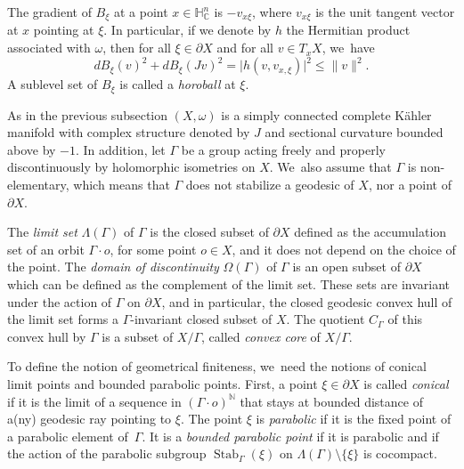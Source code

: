 \documentclass[JEP,XML,SOM,Unicode,NoEqCountersInSection,published]{cedram}
\theoremstyle{definition}
\newcommand{\C}{\mathbb{C}}
\newcommand{\N}{\mathbb{N}}
\newcommand{\HNC}{\mathbb{H}^{n}_{\C}}
\def\C{\mathbb{C}}
\newcommand{\HNC}{\mathbb{H}^{n}_{\C}}
\begin{document}
The gradient of $B_{\xi}$ at a point $x\in \HNC$ is $-v_{x\xi}$, where $v_{x\xi}$ is the unit tangent vector at $x$ pointing at $\xi$. In particular, if we denote by $h$ the Hermitian product associated with $\omega$, then for all $\xi\in \partial X$ and for all $v\in T_xX$, we~have\begin{equation}\label{ineq-dBJ}
dB_{\xi}(v)^{2} + dB_{\xi}(Jv)^{2} = \lvert h(v,v_{x,\xi})\rvert^{2}\le \lVert v\rVert^{2}.
\end{equation}
A sublevel set of $B_{\xi}$ is called a \textit{horoball} at $\xi$.

\label{sec:gen-geom-finite}

As in the previous subsection $(X,\omega)$ is a simply connected complete Kähler manifold with complex structure denoted by $J$ and sectional curvature bounded above by $-1$. In addition, let $\Gamma$ be a group acting freely and properly discontinuously by holomorphic isometries on $X$. We~also assume that $\Gamma$ is non-elementary, which means that $\Gamma$ does not stabilize a geodesic of $X$, nor a point of $\partial X$.\par

The \textit{limit set} $\Lambda(\Gamma)$ of $\Gamma$ is the closed subset of $\partial X$ defined as the accumulation set of an orbit $\Gamma \cdot o$, for some point $o\in X$, and it does not depend on the choice of the point. The \textit{domain of discontinuity} $\Omega(\Gamma)$ of $\Gamma$ is an open subset of $\partial X$ which can be defined as the complement of the limit set. These sets are invariant under the action of $\Gamma$ on $\partial X$, and in particular, the closed geodesic convex hull of the limit set forms a $\Gamma$\nobreakdash-invariant closed subset of $X$. The quotient $C_{\Gamma}$ of this convex hull by $\Gamma$ is a subset of $X/\Gamma$, called \textit{convex core} of $X/\Gamma$.

To define the notion of geometrical finiteness, we~need the notions of conical limit points and bounded parabolic points. First, a point $\xi\in \partial X$ is called \textit{conical} if it is the limit of a sequence in $(\Gamma \cdot o)^{\N}$ that stays at bounded distance of a(ny) geodesic ray pointing to $\xi$. The point $\xi$ is \textit{parabolic} if it is the fixed point of a parabolic element of~$\Gamma$. It is a \textit{bounded parabolic point} if it is parabolic and if the action of the parabolic subgroup $\operatorname{Stab}_{\Gamma}(\xi)$ on $\Lambda(\Gamma)\setminus\{\xi\}$ is cocompact.
\end{document}
